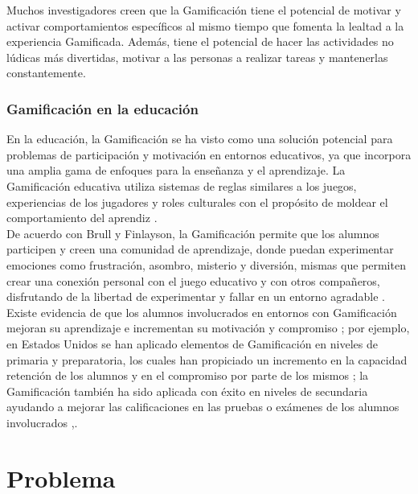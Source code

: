 \noindent Muchos investigadores creen que la Gamificación tiene el potencial de motivar y activar comportamientos específicos al mismo tiempo que fomenta la lealtad a la experiencia Gamificada. Además, tiene el potencial de hacer las actividades no lúdicas más divertidas, motivar a las personas a realizar tareas y mantenerlas constantemente. \cite{Aldemir}
\clearpage


\subsubsection{Gamificación en la educación}

En la educación, la Gamificación se ha visto como una solución potencial para problemas de participación y motivación en entornos educativos, ya que incorpora una amplia gama de enfoques para la enseñanza y el aprendizaje. La Gamificación educativa utiliza sistemas de reglas similares a los juegos, experiencias de los jugadores y roles culturales con el propósito de moldear el comportamiento del aprendiz \cite{Aldemir}.\\
    
\noindent De acuerdo con Brull y Finlayson, la Gamificación permite que los alumnos participen y creen una comunidad de aprendizaje, donde puedan experimentar emociones como frustración, asombro, misterio y diversión, mismas que permiten crear una conexión personal con el juego educativo y con otros compañeros, disfrutando de la libertad de experimentar y fallar en un entorno agradable \cite{BrullFinlayson}.\\

\noindent Existe evidencia de que los alumnos involucrados en entornos con Gamificación mejoran su aprendizaje e incrementan su motivación y compromiso \cite{ChuHung}; por ejemplo, en Estados Unidos se han aplicado elementos de Gamificación en niveles de primaria y preparatoria, los cuales han propiciado un incremento en la capacidad retención de los alumnos y en el compromiso por parte de los mismos \cite{BrullFinlayson}; la Gamificación también ha sido aplicada con éxito en niveles de secundaria ayudando a mejorar las calificaciones en las pruebas o exámenes de los alumnos involucrados \cite{UPIICSA},\cite{Admiraal}.



\section{Problema}
\label{sec:problematica}

